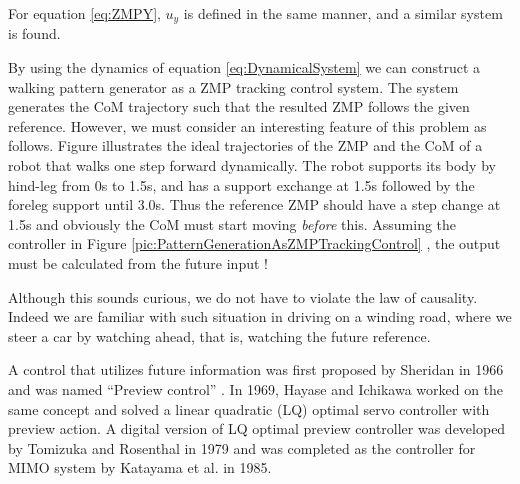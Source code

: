 %
For equation \ref{eq:ZMPY}, $u_y$ is defined in the same manner, and a similar system is found.
\par
By using the dynamics of equation \ref{eq:DynamicalSystem} we can construct a walking pattern 
generator as a ZMP tracking control system. The system generates the CoM trajectory such 
that the resulted ZMP follows the given reference.
However, we must consider an interesting feature of this problem as follows.
Figure 
illustrates the ideal trajectories of the ZMP and the CoM of a robot that walks one step forward
dynamically. The robot supports its body by hind-leg from 0s to 1.5s, and has a support 
exchange at 1.5s followed by the foreleg support until 3.0s. Thus the reference ZMP should have
a step change at 1.5s and obviously the CoM must start moving \textit{before} this.
Assuming the controller in Figure \ref{pic:PatternGenerationAsZMPTrackingControl} , the output must be calculated from the future input !
\par
Although this sounds curious, we do not have to violate the law of causality.
Indeed we are familiar with such situation in driving on a winding road, where we steer
a car by watching ahead, that is, watching the future reference.
\par
A control that utilizes future information was first proposed by Sheridan in 1966 and was named
``Preview control'' . In 1969, Hayase and Ichikawa worked on the same concept and solved 
a linear quadratic (LQ) optimal servo controller with preview 
action. A digital version of LQ optimal preview controller was developed
by Tomizuka and Rosenthal in 1979 and was completed as the controller
for MIMO system by Katayama et al. in 1985.
%
\clearpage
